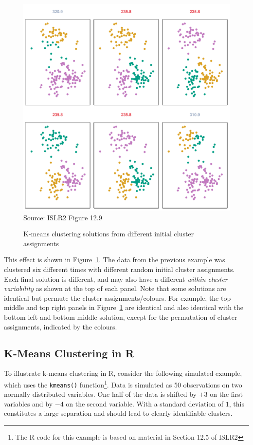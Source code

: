 \begin{figure}
\centering
\includegraphics[width=.75\textwidth]{../class11/Figures_Chapters_7-13/Chapter12/12_9.pdf} \\

\scriptsize Source: ISLR2 Figure 12.9
\caption{K-means clustering solutions from different initial cluster assignments}
\label{fig:kmeans2}
\end{figure}

This effect is shown in Figure~\ref{fig:kmeans2}. The data from the previous example was clustered six different times with different random initial cluster assignments. Each final solution is different, and may also have a different \emph{within-cluster variability} as shown at the top of each panel. Note that some solutions are identical but permute the cluster assignments/colours. For example, the top middle and top right panels in Figure~\ref{fig:kmeans2} are identical and also identical with the bottom left and bottom middle solution, except for the permutation of cluster assignments, indicated by the colours. 

\subsection{K-Means Clustering in R}

To illustrate k-means clustering in R, consider the following simulated example, which uses the \texttt{kmeans()} function\footnote{The R code for this example is based on material in Section 12.5 of ISLR2}. Data is simulated as 50 observations on two normally distributed variables. One half of the data is shifted by $+3$ on the first variables and by $-4$ on the second variable. With a standard deviation of $1$, this constitutes a large separation and should lead to clearly identifiable clusters.

